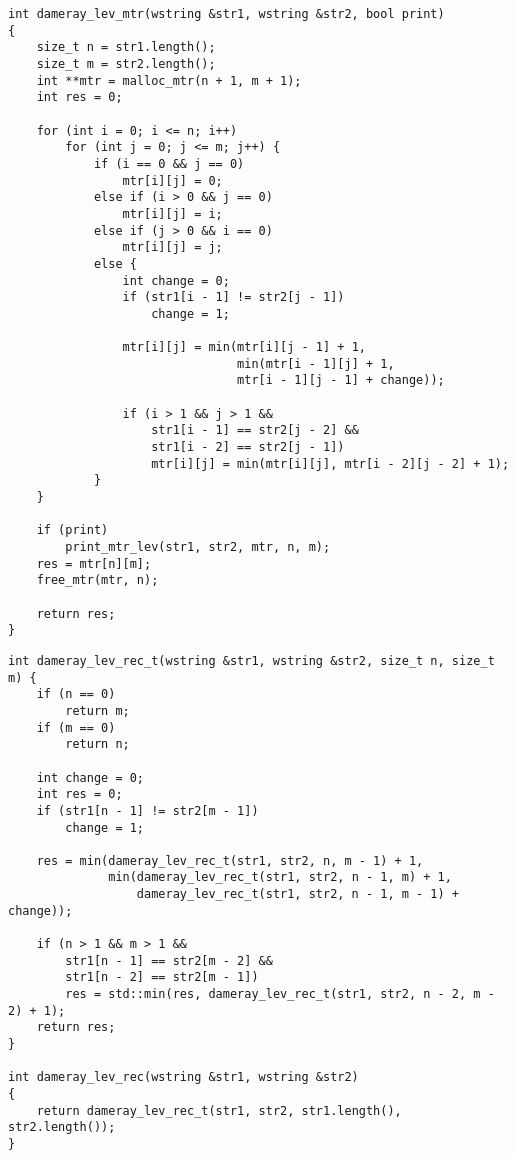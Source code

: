 \begin{lstlisting}[label=lst:dameray_lev_rec,caption=Функция нахождения расстояния Дамерау-Левенштейна с использованием матрицы]
int dameray_lev_mtr(wstring &str1, wstring &str2, bool print)
{
	size_t n = str1.length();
	size_t m = str2.length();
	int **mtr = malloc_mtr(n + 1, m + 1);
	int res = 0;
	
	for (int i = 0; i <= n; i++)
		for (int j = 0; j <= m; j++) {
			if (i == 0 && j == 0)
				mtr[i][j] = 0;
			else if (i > 0 && j == 0)
				mtr[i][j] = i;
			else if (j > 0 && i == 0)
				mtr[i][j] = j;
			else {
				int change = 0;
				if (str1[i - 1] != str2[j - 1])
					change = 1;
				
				mtr[i][j] = min(mtr[i][j - 1] + 1,
								min(mtr[i - 1][j] + 1,
								mtr[i - 1][j - 1] + change));
				
				if (i > 1 && j > 1 &&
					str1[i - 1] == str2[j - 2] &&
					str1[i - 2] == str2[j - 1])
					mtr[i][j] = min(mtr[i][j], mtr[i - 2][j - 2] + 1);
			}
	}
	
	if (print)
		print_mtr_lev(str1, str2, mtr, n, m);
	res = mtr[n][m];
	free_mtr(mtr, n);
	
	return res;
}
\end{lstlisting}

\clearpage

\begin{lstlisting}[label=lst:dameray_lev_mtr,caption=Функция нахождения расстояния Дамерау-Левенштейна рекурсивно]
int dameray_lev_rec_t(wstring &str1, wstring &str2, size_t n, size_t m) {
	if (n == 0)
		return m;
	if (m == 0)
		return n;
	
	int change = 0;
	int res = 0;
	if (str1[n - 1] != str2[m - 1])
		change = 1;
	
	res = min(dameray_lev_rec_t(str1, str2, n, m - 1) + 1,
	  		  min(dameray_lev_rec_t(str1, str2, n - 1, m) + 1,
		  		  dameray_lev_rec_t(str1, str2, n - 1, m - 1) + change));
	
	if (n > 1 && m > 1 &&
		str1[n - 1] == str2[m - 2] &&
		str1[n - 2] == str2[m - 1])
		res = std::min(res, dameray_lev_rec_t(str1, str2, n - 2, m - 2) + 1);
	return res;
}

int dameray_lev_rec(wstring &str1, wstring &str2)
{
	return dameray_lev_rec_t(str1, str2, str1.length(), str2.length());
}
\end{lstlisting}

\clearpage

